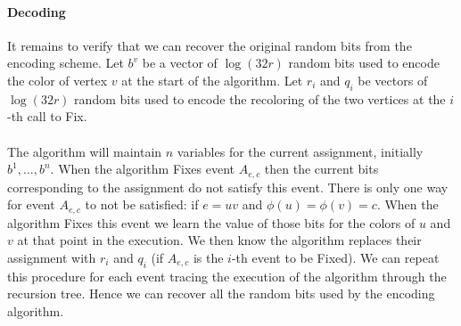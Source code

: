 \documentclass[letterpaper,12pt,oneside,onecolumn]{article}
\begin{document}
\paragraph{Decoding}
It remains to verify that we can recover the original random bits from the encoding scheme. Let $b^v$ be a vector of $\log(32r)$ random bits used to encode the color of vertex $v$ at the start of the algorithm. Let $r_i$ and $q_i$ be vectors of $\log(32r)$ random bits used to encode the recoloring of the two vertices at the $i$-th call to Fix.
\paragraph{}
The algorithm will maintain $n$ variables for the current assignment, initially $b^1,\dots, b^n$. When the algorithm Fixes event $A_{e,c}$ then the current bits corresponding to the assignment do not satisfy this event. There is only one way for event $A_{e,c}$ to not be satisfied: if $e=uv$ and $\phi(u) = \phi(v) = c$. When the algorithm Fixes this event we learn the value of those bits for the colors of $u$ and $v$ at that point in the execution. We then know the algorithm replaces their assignment with $r_i$ and $q_i$ (if $A_{e,c}$ is the $i$-th event to be Fixed). We can repeat this procedure for each event tracing the execution of the algorithm through the recursion tree. Hence we can recover all the random bits used by the encoding algorithm.
\end{document}
